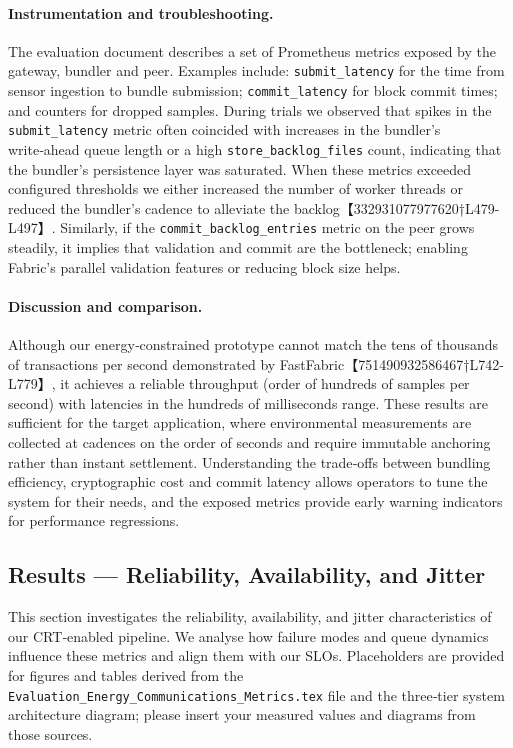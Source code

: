 \paragraph{Instrumentation and troubleshooting.}  The evaluation document
\citep{evaluation_metrics_doc} describes a set of Prometheus metrics exposed
by the gateway, bundler and peer.  Examples include: \texttt{submit\_latency}
for the time from sensor ingestion to bundle submission; \texttt{commit\_latency}
for block commit times; and counters for dropped samples.  During trials we
observed that spikes in the \texttt{submit\_latency} metric often coincided
with increases in the bundler’s write‑ahead queue length or a high
\texttt{store\_backlog\_files} count, indicating that the bundler’s persistence
layer was saturated.  When these metrics exceeded configured thresholds we
either increased the number of worker threads or reduced the bundler’s cadence
to alleviate the backlog【332931077977620†L479-L497】.  Similarly, if the
\texttt{commit\_backlog\_entries} metric on the peer grows steadily,
it implies that validation and commit are the bottleneck; enabling Fabric’s
parallel validation features or reducing block size helps.

\paragraph{Discussion and comparison.}  Although our energy‑constrained
prototype cannot match the tens of thousands of transactions per second
demonstrated by FastFabric【751490932586467†L742-L779】, it achieves a reliable
throughput (order of hundreds of samples per second) with latencies in the
hundreds of milliseconds range.  These results are sufficient for the target
application, where environmental measurements are collected at cadences on the
order of seconds and require immutable anchoring rather than instant settlement.
Understanding the trade‑offs between bundling efficiency, cryptographic cost and
commit latency allows operators to tune the system for their needs, and the
exposed metrics provide early warning indicators for performance regressions.


\subsection{Results — Reliability, Availability, and Jitter}
\label{sec:rel-avail-jitter}
This section investigates the reliability, availability, and jitter characteristics of our CRT‑enabled pipeline.  We analyse how failure modes and queue dynamics influence these metrics and align them with our SLOs.  Placeholders are provided for figures and tables derived from the \texttt{Evaluation\_Energy\_Communications\_Metrics.tex} file and the three‑tier system architecture diagram; please insert your measured values and diagrams from those sources.

